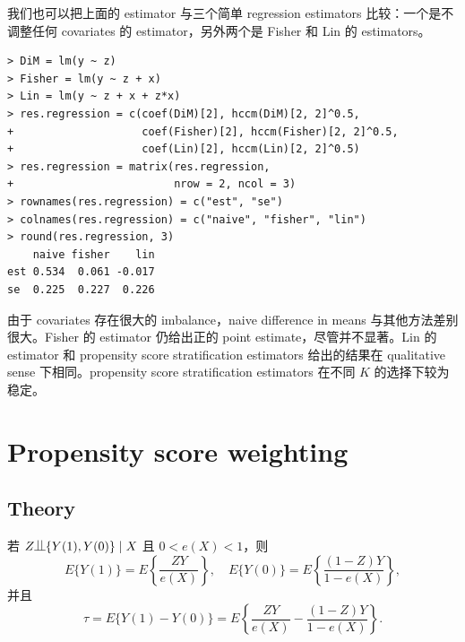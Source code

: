 我们也可以把上面的 estimator 与三个简单 regression estimators 比较：一个是不调整任何 covariates 的 estimator，另外两个是 Fisher 和 Lin 的 estimators。
\begin{lstlisting}
> DiM = lm(y ~ z)
> Fisher = lm(y ~ z + x)
> Lin = lm(y ~ z + x + z*x)
> res.regression = c(coef(DiM)[2], hccm(DiM)[2, 2]^0.5,
+                    coef(Fisher)[2], hccm(Fisher)[2, 2]^0.5,
+                    coef(Lin)[2], hccm(Lin)[2, 2]^0.5)
> res.regression = matrix(res.regression,
+                         nrow = 2, ncol = 3)
> rownames(res.regression) = c("est", "se")
> colnames(res.regression) = c("naive", "fisher", "lin")
> round(res.regression, 3)   
    naive fisher    lin
est 0.534  0.061 -0.017
se  0.225  0.227  0.226
\end{lstlisting} 
由于 covariates 存在很大的 imbalance，naive difference in means 与其他方法差别很大。Fisher 的 estimator 仍给出正的 point estimate，尽管并不显著。Lin 的 estimator 和 propensity score stratification estimators 给出的结果在 qualitative sense 下相同。propensity score stratification estimators 在不同 $K$ 的选择下较为稳定。




\section{Propensity score weighting}

\subsection{Theory}

\begin{theorem}
\label{thm::pscore-weighting}
若 $Z\ind \{ Y(1), Y(0)  \} \mid X$ 且 $0<e(X)<1$，则
$$
E\{  Y(1) \} =  E\left\{  \frac{ZY}{e(X)}  \right\},\quad
E\{  Y(0) \} =  E\left\{  \frac{(1-Z)Y}{1-e(X)}  \right\} ,
$$
并且
$$
\tau = E\{  Y(1) -  Y(0) \} =  E\left\{  \frac{ZY}{e(X)} - \frac{(1-Z)Y}{1-e(X)}   \right\} .
$$
\end{theorem}


